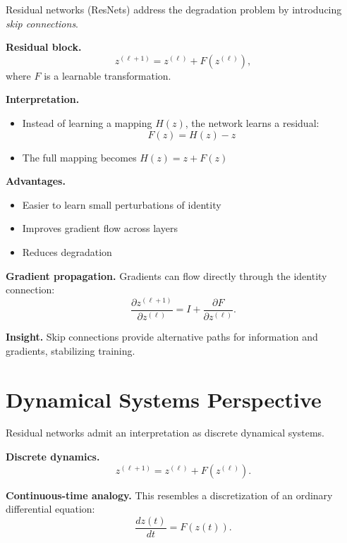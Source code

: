 Residual networks (ResNets) address the degradation problem by introducing \emph{skip connections}.

\medskip

\noindent
\textbf{Residual block.}
\[
z^{(\ell+1)} = z^{(\ell)} + F(z^{(\ell)}),
\]
where $F$ is a learnable transformation.

\medskip

\noindent
\textbf{Interpretation.}
\begin{itemize}
    \item Instead of learning a mapping $H(z)$, the network learns a residual:
    \[
    F(z) = H(z) - z
    \]
    \item The full mapping becomes $H(z) = z + F(z)$
\end{itemize}

\medskip

\noindent
\textbf{Advantages.}
\begin{itemize}
    \item Easier to learn small perturbations of identity
    \item Improves gradient flow across layers
    \item Reduces degradation
\end{itemize}

\medskip

\noindent
\textbf{Gradient propagation.}  
Gradients can flow directly through the identity connection:
\[
\frac{\partial z^{(\ell+1)}}{\partial z^{(\ell)}} = I + \frac{\partial F}{\partial z^{(\ell)}}.
\]

\medskip

\noindent
\textbf{Insight.}  
Skip connections provide alternative paths for information and gradients, stabilizing training.

\section{Dynamical Systems Perspective}

Residual networks admit an interpretation as discrete dynamical systems.

\medskip

\noindent
\textbf{Discrete dynamics.}
\[
z^{(\ell+1)} = z^{(\ell)} + F(z^{(\ell)}).
\]

\medskip

\noindent
\textbf{Continuous-time analogy.}  
This resembles a discretization of an ordinary differential equation:
\[
\frac{dz(t)}{dt} = F(z(t)).
\]

